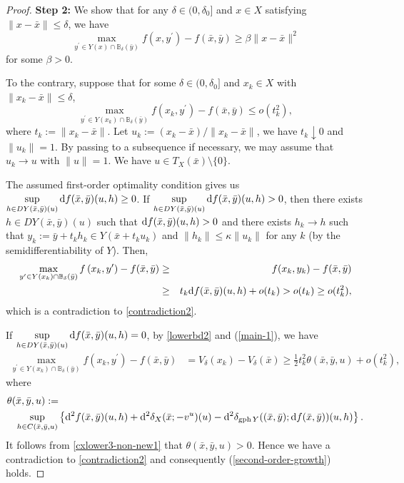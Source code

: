 \documentclass[11pt]{article}
\numberwithin{equation}{section}
\begin{document}
{\begin{proof}
{\bf Step 2:} We show that for any $\delta \in (0,\delta_0]$ and $x \in X$ satisfying $\|x-\bar x\| \leq \delta$, we have
\begin{equation}\label{second-order-growth} \max _{y^{\prime}  \in  Y(x)\cap \mathbb{B}_\delta(\bar y)} f\left(x, y^{\prime}\right) - f(\bar x,\bar y) \geq \beta \|x-\bar x\|^2\end{equation}
for some $\beta > 0$.


To the contrary, suppose that for some $\delta \in (0,\delta_0]$ and $x_k \in X$  with $\|x_k-\bar x\| \leq \delta$,
\begin{equation}\label{contradiction2}
	\max _{y^{\prime}  \in  Y(x_k)\cap \mathbb{B}_\delta(\bar y)} f\left(x_k, y^{\prime}\right)-f(\bar x,\bar y) \leq o(t_k^2),
\end{equation}
where $t_k:= \|x_k-\bar x\|$. Let $u_k:=(x_k-\bar x)/\|x_k-\bar x\|$, we have $t_k\downarrow 0$ and $\|u_k\|=1$. By passing to a subsequence if necessary, we may assume that $u_k \to u$ with $\|u\|=1$. We have $u \in T_{X}(\bar x) \setminus \{0\}$.

The assumed first-order optimality condition gives us $\sup\limits_{h \in D Y(\bar x,\bar y)(u)} {\rm d} f(\bar x,\bar y)(u,h) \geq 0$.
If $\sup\limits_{h \in D Y(\bar x,\bar y)(u)} {\rm d} f(\bar x,\bar y)(u,h) >0$,
then there exists $h \in D Y(\bar x,\bar y)(u)$ such that ${\rm d} f(\bar x,\bar y)(u,h) >0$ and there exists $h_k \to h$ such that $y_k:=\bar y+t_kh_k \in Y(\bar x+t_ku_k)$ and $\|h_k\| \leq \kappa \|u_k\|$ for any $k$ (by the semidifferentiability of $Y$). Then,
\begin{eqnarray*}\max _{y^{\prime}  \in  Y(x_k)\cap \mathbb{B}_{\delta}(\bar y)} f\left(x_k, y^{\prime}\right)-f(\bar x,\bar y) & \geq & f(x_k,y_k)-f(\bar x,\bar y)\\
& \geq & t_k {\rm d} f(\bar x,\bar y)(u,h) +o(t_k) > o(t_k) \geq o(t_k^2),\end{eqnarray*}
which is a contradiction to \eqref{contradiction2}.

If $\sup\limits_{h \in D Y(\bar x,\bar y)(u)} {\rm d} f(\bar x,\bar y)(u,h) = 0$, by \eqref{lowerbd2} and (\ref{main-1}), we have
\begin{equation}\label{theta}
	\begin{aligned}
		\max _{y^{\prime}  \in  Y(x_k)\cap \mathbb{B}_{\delta}(\bar y)} f\left(x_k, y^{\prime}\right)-f(\bar x,\bar y) & = V_{\delta}(x_k) - V_{\delta}(\bar x)  \geq \frac{1}{2}t_k^2 \theta(\bar x,\bar y, u)+o(t_k^2),
	\end{aligned}
\end{equation}
where 
\begin{eqnarray*}
\lefteqn{\theta(\bar x,\bar y, u):=}\\
&&  \sup_{h \in C(\bar x,\bar y,u)} \left\{ {\rm d}^2 f(\bar x,\bar y)(u,h) + {\rm d}^2 \delta_X(\bar x;-v^u)(u) -{\rm d}^2 \delta_{\operatorname{gph}Y}((\bar x,\bar y);{\rm d}f(\bar x,\bar y))(u,h) \right\}.\end{eqnarray*}
It follows from \eqref{cxlower3-non-new1} that $\theta(\bar x,\bar y, u)>0$. Hence we have a contradiction to \eqref{contradiction2} and consequently (\ref{second-order-growth}) holds.


\end{proof}}
\end{document}
